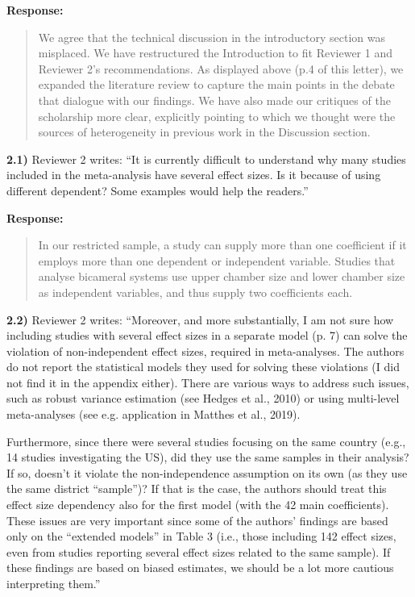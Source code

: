 \documentclass[a4paper,12pt]{article}
\begin{document}
\noindent \textbf{Response:} 
\begin{quote}
    We agree that the technical discussion in the introductory section was misplaced. We have restructured the Introduction to fit Reviewer 1 and Reviewer 2's recommendations. As displayed above (p.4 of this letter), we expanded the literature review to capture the main points in the debate that dialogue with our findings. We have also made our critiques of the scholarship more clear, explicitly pointing to which we thought were the sources of heterogeneity in previous work in the Discussion section. 
\end{quote}

\vspace{.3cm}

\noindent \textbf{2.1)} Reviewer 2 writes: ``It is currently difficult to understand why many studies included in the meta-analysis have several effect sizes. Is it because of using different dependent? Some examples would help the readers.''

\vspace{.3cm}

\noindent \textbf{Response:} 
\begin{quote}
    In our restricted sample, a study can supply more than one coefficient if it employs more than one dependent or independent variable. Studies that analyse bicameral systems use upper chamber size and lower chamber size as independent variables, and thus supply two coefficients each. 
\end{quote}

\vspace{.3cm}

\noindent \textbf{2.2)} Reviewer 2 writes: ``Moreover, and more substantially, I am not sure how including studies with several effect sizes in a separate model (p. 7) can solve the violation of non-independent effect sizes, required in meta-analyses. The authors do not report the statistical models they used for solving these violations (I did not find it in the appendix either). There are various ways to address such issues, such as robust variance estimation (see Hedges et al., 2010) or using multi-level meta-analyses (see e.g. application in Matthes et al., 2019). 

Furthermore, since there were several studies focusing on the same country (e.g., 14 studies investigating the US), did they use the same samples in their analysis? If so, doesn't it violate the non-independence assumption on its own (as they use the same district ``sample'')? If that is the case, the authors should treat this effect size dependency also for the first model (with the 42 main coefficients). These issues are very important since some of the authors' findings are based only on the ``extended models'' in Table 3 (i.e., those including 142 effect sizes, even from studies reporting several effect sizes related to the same sample). If these findings are based on biased estimates, we should be a lot more cautious interpreting them.''
\end{document}
